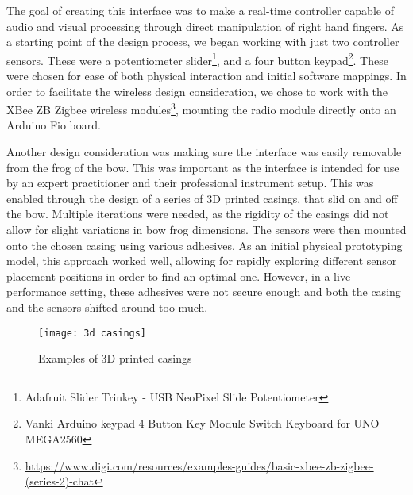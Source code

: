 \documentclass{nime-alternate}
\begin{document}

The goal of creating this interface was to make a real-time controller capable of audio and visual processing through direct manipulation of right hand fingers. As a starting point of the design process, we began working with just two controller sensors. These were a potentiometer slider\footnote{
Adafruit Slider Trinkey - USB NeoPixel Slide Potentiometer}, and a four button keypad\footnote{Vanki Arduino keypad 4 Button Key Module Switch Keyboard for UNO MEGA2560}. These were chosen for ease of both physical interaction and initial software mappings. 
In order to facilitate the wireless design consideration, we chose to work with the XBee ZB Zigbee wireless modules\footnote{\url{https://www.digi.com/resources/examples-guides/basic-xbee-zb-zigbee-(series-2)-chat}}, mounting the radio module directly onto an Arduino Fio board. 

Another design consideration was making sure the interface was easily removable from the frog of the bow. This was important as the interface is intended for use by an expert practitioner and their professional instrument setup. This was enabled through the design of a series of 3D printed casings, that slid on and off the bow. Multiple iterations were needed, as the rigidity of the casings did not allow for slight variations in bow frog dimensions. The sensors were then mounted onto the chosen casing using various adhesives. As an initial physical prototyping model, this approach worked well, allowing for rapidly exploring different sensor placement positions in order to find an optimal one. However, in a live performance setting, these adhesives were not secure enough and both the casing and the sensors shifted around too much. 


\begin{figure}[t]
	\centering
		\texttt{[image: 3d casings]}
	\caption{Examples of 3D printed casings}
	\label{fig:3d casings}
\end{figure}
\end{document}
